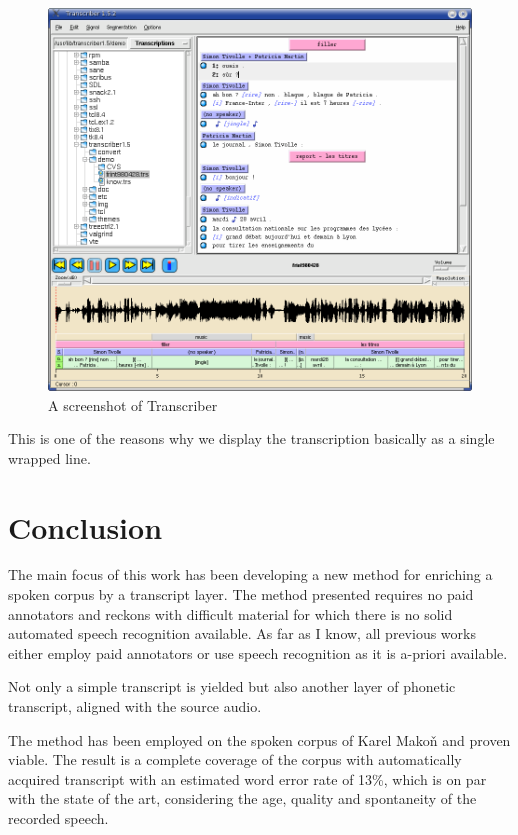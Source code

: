 \documentclass[12pt,a4paper]{report}
\begin{document}
\begin{figure}[htpb]
\includegraphics[scale=0.4]{rc/transcriber1.png}
\caption{A screenshot of Transcriber}
\label{fig:transcriber1}
\end{figure}

This is one of the reasons why we display the transcription basically as a
single wrapped line.

\chapter{Conclusion}

The main focus of this work has been developing a new method for enriching a
spoken corpus by a transcript layer. The method presented requires no paid
annotators and reckons with difficult material for which there is no solid
automated speech recognition available. As far as I know, all previous works
either employ paid annotators or use speech recognition as it is a-priori
available.

Not only a simple transcript is yielded but also another layer of phonetic
transcript, aligned with the source audio.

The method has been employed on the spoken corpus of Karel Makoň and proven
viable. The result is a complete coverage of the corpus with automatically
acquired transcript with an estimated word error rate of 13\%, which is on par
with the state of the art, considering the age, quality and spontaneity of the
recorded speech.
\end{document}

